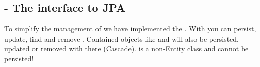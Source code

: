 \subsection{ - The interface to JPA}
To simplify the management of  we have implemented the . With  you can persist, update, find and remove . Contained objects like  and  will also be persisted, updated or removed with there  (Cascade).
 is a non-Entity class and cannot be persisted!

